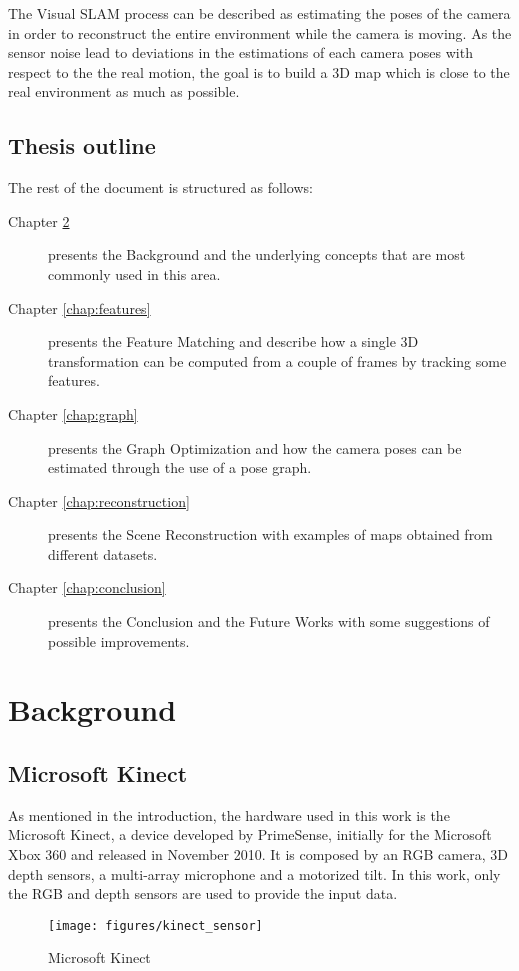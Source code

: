The Visual SLAM process can be described as estimating the poses of the camera in order to reconstruct the entire environment while the camera is moving. As the sensor noise lead to deviations in the estimations of each camera poses with respect to the the real motion, the goal is to build a 3D map which is close to the real environment as much as possible.

\section{Thesis outline}
The rest of the document is structured as follows:
\begin{description}
\item[Chapter \ref{chap:background}] presents the Background and the underlying concepts that are most commonly used in this area.
\item[Chapter \ref{chap:features}] presents the Feature Matching and describe how a single 3D transformation can be computed  from a couple of frames by tracking some features.
\item[Chapter \ref{chap:graph}] presents the Graph Optimization and how the camera poses can be estimated through the use of a pose graph.
\item[Chapter \ref{chap:reconstruction}] presents the Scene Reconstruction with examples of maps obtained from different datasets.
\item[Chapter \ref{chap:conclusion}] presents the Conclusion and the Future Works with some suggestions of possible improvements.
\end{description}

\chapter{Background}
\label{chap:background}

\section{Microsoft Kinect}

As mentioned in the introduction, the hardware used in this work is the Microsoft Kinect, a device developed by PrimeSense, initially for the Microsoft Xbox 360 and released in November 2010. It is composed by an RGB camera, 3D depth sensors, a multi-array microphone and a motorized tilt. In this work, only the RGB and depth sensors are used to provide the input data.

\begin{figure}[h]
\centering
\texttt{[image: figures/kinect\_sensor]}
\caption{Microsoft Kinect}
\end{figure}

